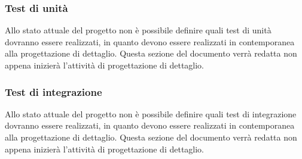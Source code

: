 \subsubsection{Test di unità}
Allo stato attuale del progetto non è possibile definire quali test di unità dovranno essere realizzati, in quanto devono essere realizzati in contemporanea alla progettazione di dettaglio.
Questa sezione del documento verrà redatta non appena inizierà l'attività di progettazione di dettaglio.

\subsubsection{Test di integrazione}
Allo stato attuale del progetto non è possibile definire quali test di integrazione dovranno essere realizzati, in quanto devono essere realizzati in contemporanea alla progettazione di dettaglio.
Questa sezione del documento verrà redatta non appena inizierà l'attività di progettazione di dettaglio.

